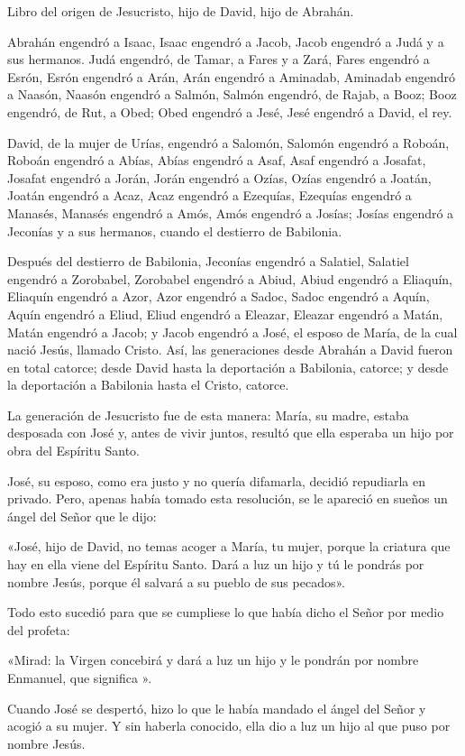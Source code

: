 		\begin{scripture}
			Libro del origen de Jesucristo, hijo de David, hijo de Abrahán.
			
			Abrahán engendró a Isaac, Isaac engendró a Jacob, Jacob engendró a Judá y a sus hermanos. Judá engendró, de Tamar, a Fares y a Zará, Fares engendró a Esrón, Esrón engendró a Arán, Arán engendró a Aminadab, Aminadab engendró a Naasón, Naasón engendró a Salmón, Salmón engendró, de Rajab, a Booz; Booz engendró, de Rut, a Obed; Obed engendró a Jesé, Jesé engendró a David, el rey.
			
			David, de la mujer de Urías, engendró a Salomón, Salomón engendró a Roboán, Roboán engendró a Abías, Abías engendró a Asaf, Asaf engendró a Josafat, Josafat engendró a Jorán, Jorán engendró a Ozías, Ozías engendró a Joatán, Joatán engendró a Acaz, Acaz engendró a Ezequías, Ezequías engendró a Manasés, Manasés engendró a Amós, Amós engendró a Josías; Josías engendró a Jeconías y a sus hermanos, cuando el destierro de Babilonia.
			
			Después del destierro de Babilonia, Jeconías engendró a Salatiel, Salatiel engendró a Zorobabel, Zorobabel engendró a Abiud, Abiud engendró a Eliaquín, Eliaquín engendró a Azor, Azor engendró a Sadoc, Sadoc engendró a Aquín, Aquín engendró a Eliud, Eliud engendró a Eleazar, Eleazar engendró a Matán, Matán engendró a Jacob; y Jacob engendró a José, el esposo de María, de la cual nació Jesús, llamado Cristo. Así, las generaciones desde Abrahán a David fueron en total catorce; desde David hasta la deportación a Babilonia, catorce; y desde la deportación a Babilonia hasta el Cristo, catorce.
			
			La generación de Jesucristo fue de esta manera: María, su madre, estaba desposada con José y, antes de vivir juntos, resultó que ella esperaba un hijo por obra del Espíritu Santo.
			
			José, su esposo, como era justo y no quería difamarla, decidió repudiarla en privado. Pero, apenas había tomado esta resolución, se le apareció en sueños un ángel del Señor que le dijo:
			
			«José, hijo de David, no temas acoger a María, tu mujer, porque la criatura que hay en ella viene del Espíritu Santo. Dará a luz un hijo y tú le pondrás por nombre Jesús, porque él salvará a su pueblo de sus pecados».
			
			Todo esto sucedió para que se cumpliese lo que había dicho el Señor por medio del profeta:
			
			«Mirad: la Virgen concebirá y dará a luz un hijo y le pondrán por nombre Enmanuel, que significa ».
			
			Cuando José se despertó, hizo lo que le había mandado el ángel del Señor y acogió a su mujer. Y sin haberla conocido, ella dio a luz un hijo al que puso por nombre Jesús.
		\end{scripture}

